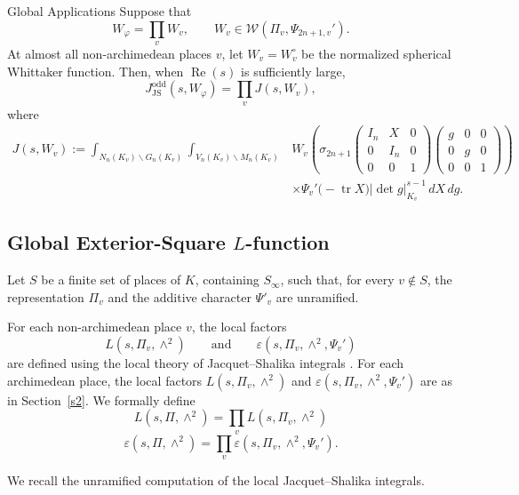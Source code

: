 \documentclass[12pt,reqno]{amsart}
\numberwithin{equation}{section}%
\numberwithin{equation}{subsection}
\theoremstyle{definition}
\theoremstyle{remark}
\begin{document}
\begin{section}{Global Applications}
Suppose that
\[
  W_\varphi=\prod_v W_v,
  \qquad
  W_v\in\mathcal{W}(\Pi_v,\Psi_{2n+1,v}').
\]
At almost all non-archimedean places \(v\), let \(W_v=W_v^\circ\)
be the normalized spherical Whittaker function. Then, when
\(\operatorname{Re}(s)\) is sufficiently large,
\[
  J_{\mathrm{JS}}^{\mathrm{odd}}(s,W_\varphi)
  =
  \prod_v
  J(s,W_v),
\]
where
\[
\begin{split}
  J(s,W_v)
  :=
  \int_{N_n(K_v)\backslash G_n(K_v)}
  \int_{V_n(K_v)\backslash M_n(K_v)}
  &W_v\left(
    \sigma_{2n+1}
    \begin{pmatrix}
      I_n & X   & 0\\
      0   & I_n & 0\\
      0   & 0   & 1
    \end{pmatrix}
    \begin{pmatrix}
      g & 0 & 0\\
      0 & g & 0\\
      0 & 0 & 1
    \end{pmatrix}
  \right)                                                     \\
  &\times
  \Psi_v'\bigl(-\operatorname{tr}X\bigr)
  |\det g|_{K_v}^{s-1}\,dX\,dg.
\end{split}
\]

\subsection{Global Exterior-Square \(L\)-function}

Let \(S\) be a finite set of places of \(K\), containing \(S_\infty\),
such that, for every \(v\notin S\), the representation \(\Pi_v\) and
the additive character \(\Psi'_v\) are unramified.

For each non-archimedean place \(v\), the local factors
\[
  L(s,\Pi_v,\wedge^2)
  \qquad\text{and}\qquad
  \varepsilon(s,\Pi_v,\wedge^2,\Psi_v')
\]
are defined using the local theory of Jacquet--Shalika integrals
\cite{JS1990,KR2012,Mat2014,CM2015}. For each archimedean place, the local factors
\(L(s,\Pi_v,\wedge^2)\) and
\(\varepsilon(s,\Pi_v,\wedge^2,\Psi_v')\) are as in Section~\ref{s2}. We formally define
\[
  L(s,\Pi,\wedge^2)
  =
  \prod_v L(s,\Pi_v,\wedge^2)
\]
\[
  \varepsilon(s,\Pi,\wedge^2)
  =
  \prod_v
  \varepsilon(s,\Pi_v,\wedge^2,\Psi_v').
\]

We recall the unramified computation of the local
Jacquet--Shalika integrals.


\end{section}
\end{document}
